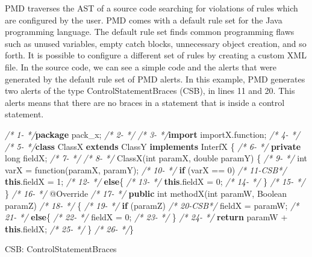 \documentclass[
]{article}
\newenvironment{Shaded}{\begin{snugshade}}{\end{snugshade}}
\newcommand{\AttributeTok}[1]{\textcolor[rgb]{0.77,0.63,0.00}{#1}}
\newcommand{\BuiltInTok}[1]{#1}
\newcommand{\CommentTok}[1]{\textcolor[rgb]{0.56,0.35,0.01}{\textit{#1}}}
\newcommand{\DataTypeTok}[1]{\textcolor[rgb]{0.13,0.29,0.53}{#1}}
\newcommand{\DecValTok}[1]{\textcolor[rgb]{0.00,0.00,0.81}{#1}}
\newcommand{\FunctionTok}[1]{\textcolor[rgb]{0.00,0.00,0.00}{#1}}
\newcommand{\ImportTok}[1]{#1}
\newcommand{\KeywordTok}[1]{\textcolor[rgb]{0.13,0.29,0.53}{\textbf{#1}}}
\newcommand{\NormalTok}[1]{#1}
\begin{document}
PMD traverses the AST of a source code searching for violations of rules
which are configured by the user. PMD comes with a default rule set for
the Java programming language. The default rule set finds common
programming flaws such as unused variables, empty catch blocks,
unnecessary object creation, and so forth. It is possible to configure a
different set of rules by creating a custom XML file. In the source
code, we can see a simple code and the alerts that were generated by the
default rule set of PMD alerts. In this example, PMD generates two
alerts of the type ControlStatementBraces (CSB), in lines 11 and 20.
This alerts means that there are no braces in a statement that is inside
a control statement.

\small

\normalsize

\small

\begin{Shaded}
\begin{Highlighting}[]
\CommentTok{/*  1-   */}\KeywordTok{package}\ImportTok{ pack_x;}
\CommentTok{/*  2-   */}  
\CommentTok{/*  3-   */}\KeywordTok{import}\ImportTok{ importX.function;}
\CommentTok{/*  4-   */}
\CommentTok{/*  5-   */}\KeywordTok{class}\NormalTok{ ClassX }\KeywordTok{extends}\NormalTok{ ClassY }\KeywordTok{implements}\NormalTok{ InterfX \{}
\CommentTok{/*  6-   */}    \KeywordTok{private} \DataTypeTok{long}\NormalTok{ fieldX;}
\CommentTok{/*  7-   */}    
\CommentTok{/*  8-   */}    \FunctionTok{ClassX}\NormalTok{(}\DataTypeTok{int}\NormalTok{ paramX, }\DataTypeTok{double}\NormalTok{ paramY) \{}
\CommentTok{/*  9-   */}        \DataTypeTok{int}\NormalTok{ varX = }\FunctionTok{function}\NormalTok{(paramX, paramY);     }
\CommentTok{/* 10-   */}        \KeywordTok{if}\NormalTok{ (varX == }\DecValTok{0}\NormalTok{)}
\CommentTok{/* 11-CSB*/}            \KeywordTok{this}\NormalTok{.}\FunctionTok{fieldX}\NormalTok{ = }\DecValTok{1}\NormalTok{;}
\CommentTok{/* 12-   */}        \KeywordTok{else}\NormalTok{\{}
\CommentTok{/* 13-   */}            \KeywordTok{this}\NormalTok{.}\FunctionTok{fieldX}\NormalTok{ = }\DecValTok{0}\NormalTok{;}
\CommentTok{/* 14-   */}\NormalTok{     \}}
\CommentTok{/* 15-   */}\NormalTok{    \}}
\CommentTok{/* 16-   */}    \AttributeTok{@Override}
\CommentTok{/* 17-   */}    \KeywordTok{public} \DataTypeTok{int} \FunctionTok{methodX}\NormalTok{(}\DataTypeTok{int}\NormalTok{ paramW, }\BuiltInTok{Boolean}\NormalTok{ paramZ)}
\CommentTok{/* 18-   */}\NormalTok{    \{}
\CommentTok{/* 19-   */}        \KeywordTok{if}\NormalTok{ (paramZ)}
\CommentTok{/* 20-CSB*/}\NormalTok{            fieldX = paramW;}
\CommentTok{/* 21-   */}        \KeywordTok{else}\NormalTok{\{}
\CommentTok{/* 22-   */}\NormalTok{            fieldX = }\DecValTok{0}\NormalTok{;}
\CommentTok{/* 23-   */}\NormalTok{     \}}
\CommentTok{/* 24-   */}        \KeywordTok{return}\NormalTok{ paramW + }\KeywordTok{this}\NormalTok{.}\FunctionTok{fieldX}\NormalTok{;}
\CommentTok{/* 25-   */}\NormalTok{     \}}
\CommentTok{/* 26-   */}\NormalTok{\}  }


\NormalTok{CSB: ControlStatementBraces}
\end{Highlighting}
\end{Shaded}
\end{document}

